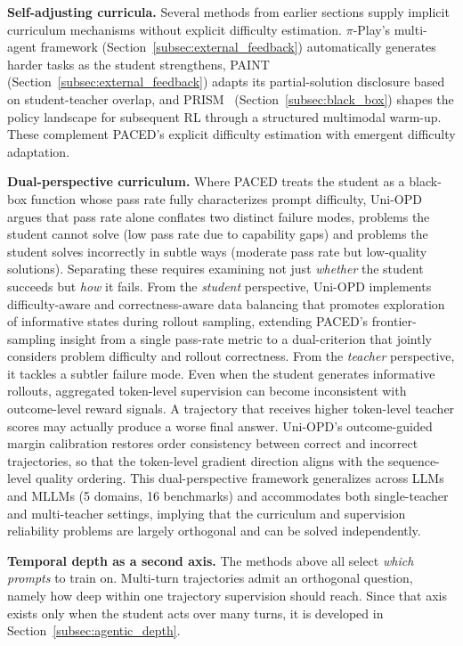 \documentclass{article} %
\begin{document}
\textbf{Self-adjusting curricula.} Several methods from earlier sections supply implicit curriculum mechanisms without explicit difficulty estimation. $\pi$-Play's multi-agent framework (Section~\ref{subsec:external_feedback}) automatically generates harder tasks as the student strengthens, PAINT~\citep{2604.26573} (Section~\ref{subsec:external_feedback}) adapts its partial-solution disclosure based on student-teacher overlap, and PRISM~\citep{2604.28123} (Section~\ref{subsec:black_box}) shapes the policy landscape for subsequent RL through a structured multimodal warm-up. These complement PACED's explicit difficulty estimation with emergent difficulty adaptation.

\textbf{Dual-perspective curriculum.} Where PACED treats the student as a black-box function whose pass rate fully characterizes prompt difficulty, Uni-OPD~\citep{2605.03677} argues that pass rate alone conflates two distinct failure modes, problems the student cannot solve (low pass rate due to capability gaps) and problems the student solves incorrectly in subtle ways (moderate pass rate but low-quality solutions). Separating these requires examining not just \emph{whether} the student succeeds but \emph{how} it fails. From the \emph{student} perspective, Uni-OPD implements difficulty-aware and correctness-aware data balancing that promotes exploration of informative states during rollout sampling, extending PACED's frontier-sampling insight from a single pass-rate metric to a dual-criterion that jointly considers problem difficulty and rollout correctness. From the \emph{teacher} perspective, it tackles a subtler failure mode. Even when the student generates informative rollouts, aggregated token-level supervision can become inconsistent with outcome-level reward signals. A trajectory that receives higher token-level teacher scores may actually produce a worse final answer. Uni-OPD's outcome-guided margin calibration restores order consistency between correct and incorrect trajectories, so that the token-level gradient direction aligns with the sequence-level quality ordering. This dual-perspective framework generalizes across LLMs and MLLMs (5 domains, 16 benchmarks) and accommodates both single-teacher and multi-teacher settings, implying that the curriculum and supervision reliability problems are largely orthogonal and can be solved independently.

\textbf{Temporal depth as a second axis.} The methods above all select \emph{which prompts} to train on. Multi-turn trajectories admit an orthogonal question, namely how deep within one trajectory supervision should reach. Since that axis exists only when the student acts over many turns, it is developed in Section~\ref{subsec:agentic_depth}.
\end{document}
